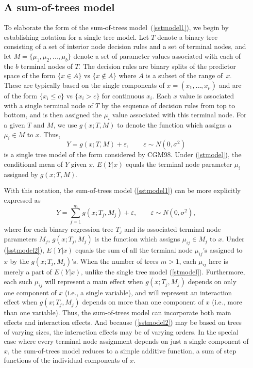 \documentclass[aoas,nameyear,dvips]{arximspdf}
\let\epsilon\varepsilon
\begin{document}
\subsection{A sum-of-trees model}

To elaborate the form of the sum-of-trees mod\-el~(\ref{sstmodel1}), we begin by
establishing notation for a single tree model. Let $T$ denote a
binary tree consisting of a set of interior node decision rules
and a set of terminal nodes, and let $M =
\{\mu_1,\mu_2,\ldots,\mu_b\}$ denote a set of parameter values
associated with each of the $b$ terminal nodes of $T$. The
decision rules are binary splits of the predictor space of the
form $\{x \in A\}$ vs $\{x \notin A\}$ where $A$ is a subset of
the range of~$x$.  These are typically based on the single components of
$x = (x_1,\ldots,x_p)$ and are of the
form $\{x_i \le c\}$ vs $\{x_i > c\}$ for continuous $x_i$.
Each $x$ value is associated with a single
terminal node of $T$ by the sequence of decision rules from top to
bottom, and is then assigned the $\mu_i$ value associated with
this terminal node. For a given $T$ and $M$, we use $g(x; T,M)$ to
denote the function which assigns a $\mu_i \in M$ to $x$.
Thus,
\begin{equation}\label{stmodel}
Y = g(x; T,M) + \epsilon,\qquad
   \epsilon \sim N(0,\sigma^2)
\end{equation}
is a single tree model of the form considered by CGM98.  Under (\ref{stmodel}),
the conditional mean of $Y$ given $x$, $E(Y | x)$ equals the
terminal node parameter $\mu_i$ assigned by $g(x;T,M)$.

With this notation, the sum-of-trees model (\ref{sstmodel1}) can
be more explicitly expressed as
\begin{equation}\label{sstmodel2}
Y = \sum_{j=1}^m g(x; T_j,M_j)   +
\epsilon,\qquad
   \epsilon \sim N(0,\sigma^2),
\end{equation}
where for each binary regression tree $T_j$ and its associated terminal node parameters $M_j$, $g(x; T_j,M_j)$ is the function which assigns $\mu_{ij} \in M_j$ to $x$.
Under (\ref{sstmodel2}), $E(Y | x)$  equals the sum of all the terminal node
$\mu_{ij}$'s assigned to $x$ by the $g(x; T_j,M_j)$'s.
When the number of trees $m > 1$,  each $\mu_{ij}$ here is merely a part of $E(Y | x)$, unlike the single tree model (\ref{stmodel}).  Furthermore, each such $\mu_{ij}$ will represent a main effect when $g(x;
T_j,M_j)$ depends on only one component of $x$ (i.e., a single
variable), and will represent an interaction effect when $g(x;
T_j,M_j)$ depends on more than one component of $x$ (i.e., more than
one variable).  Thus, the sum-of-trees model can incorporate both
main effects and interaction effects.  And because (\ref{sstmodel2})
may be based on trees of varying sizes, the interaction effects may
be of varying orders. In the special case where every terminal node
assignment depends on just a single component of $x$, the
sum-of-trees model reduces to a simple additive function, a sum of step functions of the
individual components of $x$.
\end{document}
